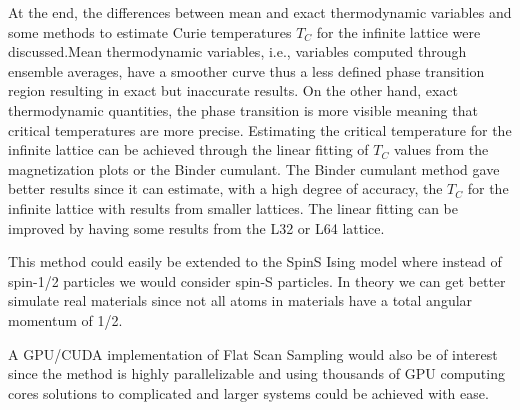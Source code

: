 	At the end, the differences between mean and exact thermodynamic variables and some methods to estimate Curie temperatures $T_C$ for the infinite lattice were discussed.Mean thermodynamic variables, i.e., variables computed through ensemble averages, have a smoother curve thus a less defined phase transition region resulting in exact but inaccurate results. On the other hand, exact thermodynamic quantities, the phase transition is more visible meaning that critical temperatures are more precise. Estimating the critical temperature for the infinite lattice can be achieved through the linear fitting of $T_C$ values from the magnetization plots or the Binder cumulant. The Binder cumulant method gave better results since it can estimate, with a high degree of accuracy, the $T_C$ for the infinite lattice with results from smaller lattices. The linear fitting can be improved by having some results from the L32 or L64 lattice.

	This method could easily be extended to the SpinS Ising model where instead of spin-1/2 particles we would consider spin-S particles. In theory we can get better simulate real materials since not all atoms in materials have a total angular momentum of 1/2. 
	
	A GPU/CUDA implementation of Flat Scan Sampling would also be of interest since the method is highly parallelizable and using thousands of GPU computing cores solutions to complicated and larger systems could be achieved with ease.
	
	
	
	
